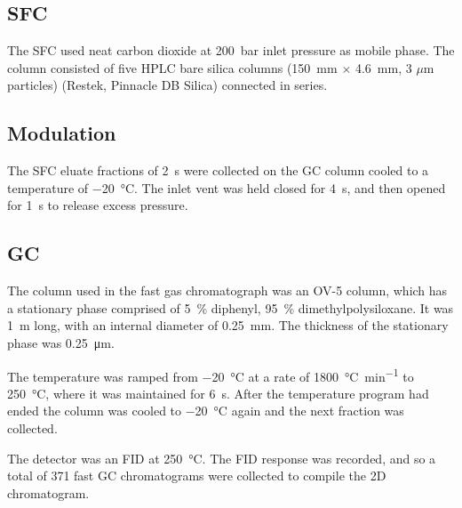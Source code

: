 \subsection{SFC}

The SFC used neat carbon dioxide at \SI{200}{\bar} inlet pressure as mobile
phase. The column consisted of five HPLC bare silica columns
(\SI{150}{\milli\metre} $\times$ \SI{4.6}{\milli\metre}, 3 $\mu$m particles)
(Restek, Pinnacle DB Silica) connected in series.

\subsection{Modulation}

The SFC eluate fractions of \SI{2}{\second} were collected on the GC column
cooled to a temperature of \SI{-20}{\celsius}. The inlet vent was held closed
for \SI{4}{\second}, and then opened for \SI{1}{\second} to release excess
pressure.

\subsection{GC}

The column used in the fast gas chromatograph was an OV-5 column, which has a
stationary phase comprised of \SI{5}{\percent} diphenyl, \SI{95}{\percent}
dimethylpolysiloxane. It was \SI{1}{\metre} long, with an internal diameter of
\SI{0.25}{\milli\metre}. The thickness of the stationary phase was
\SI{0.25}{\micro\metre}.

The temperature was ramped from \SI{-20}{\celsius} at a rate of
\SI{1800}{\celsius\per\minute} to \SI{250}{\celsius}, where it was maintained
for \SI{6}{s}. After the temperature program had ended the column was cooled to
\SI{-20}{\celsius} again and the next fraction was collected.

The detector was an FID at \SI{250}{\celsius}. The FID response was recorded,
and so a total of 371 fast GC chromatograms were collected to compile the 2D
chromatogram.

